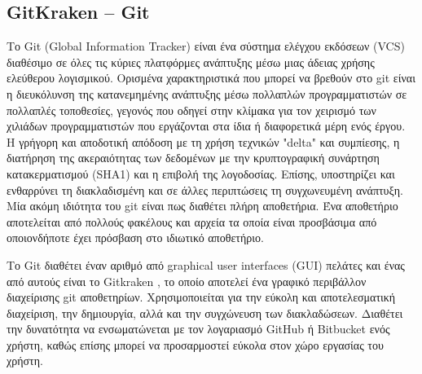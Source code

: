 \subsection{GitKraken – Git}
Το Git (Global Information Tracker) είναι ένα σύστημα ελέγχου εκδόσεων (VCS) διαθέσιμο σε όλες τις κύριες πλατφόρμες ανάπτυξης μέσω μιας άδειας χρήσης ελεύθερου λογισμικού. \cite{spinellis2012git} Ορισμένα χαρακτηριστικά που μπορεί να βρεθούν στο git είναι η διευκόλυνση της κατανεμημένης ανάπτυξης μέσω πολλαπλών προγραμματιστών σε πολλαπλές τοποθεσίες, γεγονός που οδηγεί στην κλίμακα για τον χειρισμό των χιλιάδων προγραμματιστών που εργάζονται στα ίδια ή διαφορετικά μέρη ενός έργου. Η γρήγορη και αποδοτική απόδοση με τη χρήση τεχνικών "delta" και συμπίεσης, η διατήρηση της ακεραιότητας των δεδομένων με την κρυπτογραφική συνάρτηση κατακερματισμού (SHA1) και η επιβολή της λογοδοσίας. Επίσης, υποστηρίζει και ενθαρρύνει τη διακλαδισμένη και σε άλλες περιπτώσεις τη συγχωνευμένη ανάπτυξη. Μία ακόμη ιδιότητα του git είναι πως διαθέτει πλήρη αποθετήρια. Ένα αποθετήριο αποτελείται από πολλούς φακέλους και αρχεία τα οποία είναι προσβάσιμα από οποιονδήποτε έχει πρόσβαση στο ιδιωτικό αποθετήριο. \cite{loeliger2012version}

Το Git διαθέτει έναν αριθμό από graphical user interfaces (GUI) πελάτες και ένας από αυτούς είναι το Gitkraken \cite{gitkrakenwhatisit}, το οποίο αποτελεί ένα γραφικό περιβάλλον διαχείρισης git αποθετηρίων. Χρησιμοποιείται για την εύκολη και αποτελεσματική διαχείριση, την δημιουργία, αλλά και την συγχώνευση των διακλαδώσεων. Διαθέτει την δυνατότητα να ενσωματώνεται με τον λογαριασμό GitHub ή Bitbucket ενός χρήστη, καθώς επίσης μπορεί να προσαρμοστεί εύκολα στον χώρο εργασίας του χρήστη.

